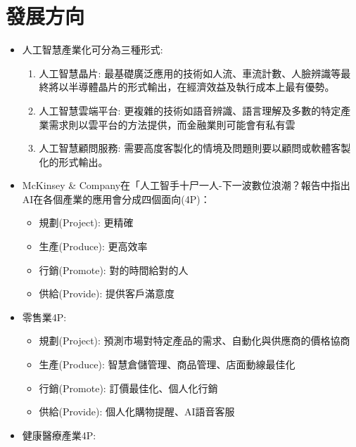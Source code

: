 \documentclass[a4paper,12pt]{article}
\begin{document}
\section{發展方向}
\label{sec:org15d9540}
\begin{itemize}
\item 人工智慧產業化可分為三種形式:\\
\begin{enumerate}
\item 人工智慧晶片: 最基礎廣泛應用的技術如人流、車流計數、人臉辨識等最終將以半導體晶片的形式輸出，在經濟效益及執行成本上最有優勢。\\
\item 人工智慧雲端平台: 更複雜的技術如語音辨識、語言理解及多數的特定產業需求則以雲平台的方法提供，而金融業則可能會有私有雲\\
\item 人工智慧顧問服務: 需要高度客製化的情境及問題則要以顧問或軟體客製化的形式輸出。\\
\end{enumerate}
\item McKinsey \& Company在「人工智手十尸一人-下一波數位浪潮？報告中指出AI在各個產業的應用會分成四個面向(4P)：\\
\begin{itemize}
\item 規劃(Project): 更精確\\
\item 生產(Produce): 更高效率\\
\item 行銷(Promote): 對的時間給對的人\\
\item 供給(Provide): 提供客戶滿意度\\
\end{itemize}
\item 零售業4P:\\
\begin{itemize}
\item 規劃(Project): 預測市場對特定產品的需求、自動化與供應商的價格協商\\
\item 生產(Produce): 智慧倉儲管理、商品管理、店面動線最佳化\\
\item 行銷(Promote): 訂價最佳化、個人化行銷\\
\item 供給(Provide): 個人化購物提醒、AI語音客服\\
\end{itemize}
\item 健康醫療產業4P:\\

\end{itemize}
\end{document}
